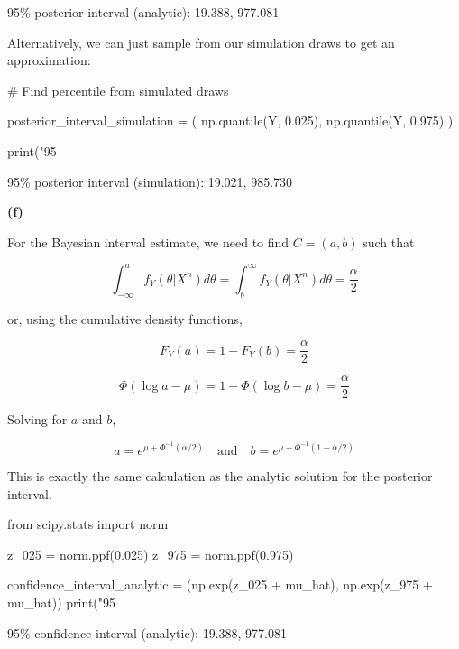 \begin{console}
95\% posterior interval (analytic):  19.388, 977.081
\end{console}

Alternatively, we can just sample from our simulation draws to get an
approximation:

\begin{python}
# Find percentile from simulated draws

posterior_{i}nterval_simulation = (
    np.quantile(Y, 0.025),
    np.quantile(Y, 0.975)
)

print("95%
\end{python}

\begin{console}
95\% posterior interval (simulation):  19.021, 985.730
\end{console}

\textbf{(f)}

For the Bayesian interval estimate, we need to find \(C = (a, b)\) such
that

\[ \int_{-\infty}^{a} f_Y(\theta | X^{n}) d\theta = \int_b^{\infty} f_Y(\theta | X^{n}) d\theta = \frac{\alpha}{2}\]

or, using the cumulative density functions,

\[ F_Y(a) = 1 - F_Y(b) = \frac{\alpha}{2}\]

\[\Phi(\log a - \mu) = 1 - \Phi(\log b - \mu) = \frac{\alpha}{2}\]

Solving for \(a\) and \(b\),

\[
a = e^{\mu + \Phi^{-1}(\alpha / 2)}
\quad \text{and} \quad
b = e^{\mu + \Phi^{-1}(1 - \alpha / 2)}
\]

This is exactly the same calculation as the analytic solution for the
posterior interval.

\begin{python}
from scipy.stats import norm

z_{0}25 = norm.ppf(0.025)
z_975 = norm.ppf(0.975)

confidence_{i}nterval_analytic = (np.exp(z_{0}25 + mu_hat), np.exp(z_975 + mu_hat))
print("95%
\end{python}

\begin{console}
95\% confidence interval (analytic):  19.388, 977.081
\end{console}

